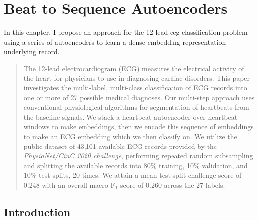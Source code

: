 \documentclass[\main/thesis.tex]{subfiles}
\begin{document}
\chapter{Beat to Sequence Autoencoders}
\label{chp:dl_autoenc}

In this chapter, I propose an approach for the 12-lead \gls{ecg} classification problem using a series of autoencoders to learn a dense embedding representation underlying record.


\begin{abstract}
The 12-lead electrocardiogram (ECG) measures the electrical activity of the heart for physicians to use in diagnosing cardiac disorders.
This paper investigates the multi-label, multi-class classification of ECG records into one or more of 27 possible medical diagnoses.
Our multi-step approach uses conventional physiological algorithms for segmentation of heartbeats from the baseline signals.
We stack a heartbeat autoencoder over heartbeat windows to make embeddings, then we encode this sequence of embeddings to make an ECG embedding which we then classify on.
We utilize the public dataset of 43,101 available ECG records provided by the \emph{PhysioNet/CinC 2020 challenge}, performing repeated random subsampling and splitting the available records into 80\% training, 10\% validation, and 10\% test splits, 20 times.
We attain a mean test split challenge score of 0.248 with an overall macro $\text{F}_1$ score of 0.260 across the 27 labels.
\end{abstract}
%
%
\section{Introduction}
\end{document}
